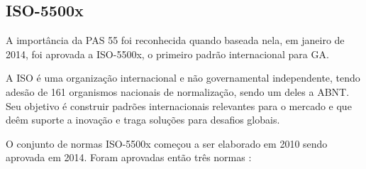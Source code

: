 \subsection{ISO-5500x}

A importância da PAS 55 foi reconhecida quando baseada nela, em janeiro de 2014, foi aprovada a ISO-5500x, o primeiro padrão internacional para GA. 

A ISO é uma organização internacional e não governamental independente, tendo adesão de 161 organismos nacionais de normalização, sendo um deles a ABNT. Seu objetivo é construir padrões internacionais relevantes para o mercado e que deêm suporte a inovação e traga soluções para desafios globais.

O conjunto de normas ISO-5500x começou a ser elaborado em 2010 sendo aprovada em 2014. Foram aprovadas então três normas \cite{abraman}:

